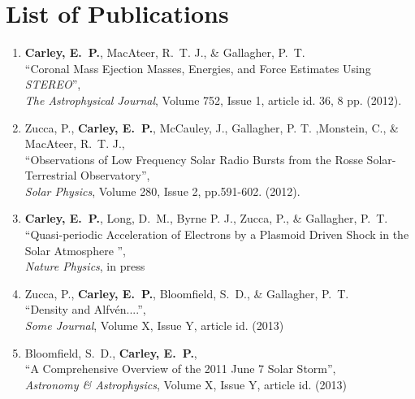 \chapter{List of Publications}
\label{chapter:publications}


\begin{enumerate}

\item \textbf{Carley, E.~P.}, MacAteer, R.~T. J., \& Gallagher, P.~T.\\
``Coronal Mass Ejection Masses, Energies, and Force Estimates Using \emph{STEREO}'', \\
\emph{The Astrophysical Journal}, Volume 752, Issue 1, article id. 36, 8 pp. (2012).

\item Zucca, P., \textbf{Carley, E.~P.},  McCauley, J., Gallagher, P. T. ,Monstein, C., \& MacAteer, R.~T. J.,\\
``Observations of Low Frequency Solar Radio Bursts from the Rosse Solar-Terrestrial Observatory'', \\
\emph{Solar Physics}, Volume 280, Issue 2, pp.591-602. (2012).

\item \textbf{Carley, E.~P.}, Long, D.~M., Byrne P. J., Zucca, P., \& Gallagher, P.~T.\\
``Quasi-periodic Acceleration of Electrons by a Plasmoid Driven Shock in the Solar Atmosphere '', \\
\emph{Nature Physics}, in press 

\item Zucca, P., \textbf{Carley, E.~P.}, Bloomfield, S.~D., \& Gallagher, P.~T.\\
``Density and Alfv\'{e}n....'', \\
\emph{Some Journal}, Volume X, Issue Y, article id. (2013)

\item Bloomfield, S.~D., \textbf{Carley, E.~P.},\\
``A Comprehensive Overview of the 2011 June 7 Solar Storm'', \\
\emph{Astronomy \& Astrophysics}, Volume X, Issue Y, article id. (2013)


\end{enumerate}

